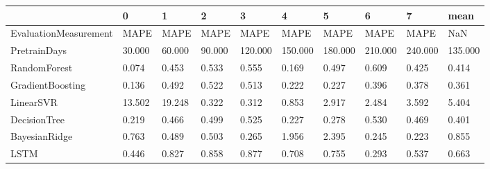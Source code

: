 \begin{tabular}{llllllllll}
\toprule
{} &      0 &      1 &      2 &       3 &       4 &       5 &       6 &       7 &    mean \\
\midrule
EvaluationMeasurement &   MAPE &   MAPE &   MAPE &    MAPE &    MAPE &    MAPE &    MAPE &    MAPE &     NaN \\
PretrainDays          & 30.000 & 60.000 & 90.000 & 120.000 & 150.000 & 180.000 & 210.000 & 240.000 & 135.000 \\
RandomForest          &  0.074 &  0.453 &  0.533 &   0.555 &   0.169 &   0.497 &   0.609 &   0.425 &   0.414 \\
GradientBoosting      &  0.136 &  0.492 &  0.522 &   0.513 &   0.222 &   0.227 &   0.396 &   0.378 &   0.361 \\
LinearSVR             & 13.502 & 19.248 &  0.322 &   0.312 &   0.853 &   2.917 &   2.484 &   3.592 &   5.404 \\
DecisionTree          &  0.219 &  0.466 &  0.499 &   0.525 &   0.227 &   0.278 &   0.530 &   0.469 &   0.401 \\
BayesianRidge         &  0.763 &  0.489 &  0.503 &   0.265 &   1.956 &   2.395 &   0.245 &   0.223 &   0.855 \\
LSTM                  &  0.446 &  0.827 &  0.858 &   0.877 &   0.708 &   0.755 &   0.293 &   0.537 &   0.663 \\
\bottomrule
\end{tabular}
